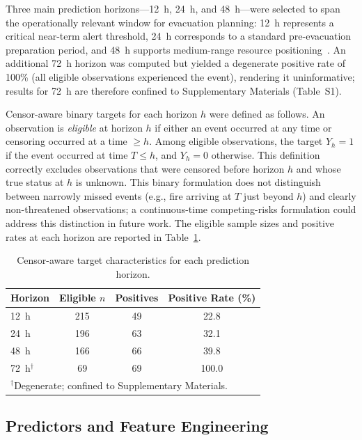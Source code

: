 \documentclass[fire,article,submit,pdftex]{../Definitions/mdpi}
\begin{document}
Three main prediction horizons---12~h, 24~h, and 48~h---were selected to span the operationally relevant window for evacuation planning: 12~h represents a critical near-term alert threshold, 24~h corresponds to a standard pre-evacuation preparation period, and 48~h supports medium-range resource positioning~\cite{Stephens2018,Taylor2013}.
An additional 72~h horizon was computed but yielded a degenerate positive rate of 100\% (all eligible observations experienced the event), rendering it uninformative; results for 72~h are therefore confined to Supplementary Materials (Table~S1).

Censor-aware binary targets for each horizon $h$ were defined as follows.
An observation is \emph{eligible} at horizon $h$ if either an event occurred at any time or censoring occurred at a time $\geq h$.
Among eligible observations, the target $Y_h = 1$ if the event occurred at time $T \leq h$, and $Y_h = 0$ otherwise.
This definition correctly excludes observations that were censored before horizon $h$ and whose true status at $h$ is unknown.
This binary formulation does not distinguish between narrowly missed events (e.g., fire arriving at $T$ just beyond $h$) and clearly non-threatened observations; a continuous-time competing-risks formulation could address this distinction in future work.
The eligible sample sizes and positive rates at each horizon are reported in Table~\ref{tab:horizons}.

\begin{table}[!ht]
\caption{Censor-aware target characteristics for each prediction horizon.}\label{tab:horizons}
\begin{tabular}{lccc}
\toprule
\textbf{Horizon} & \textbf{Eligible $n$} & \textbf{Positives} & \textbf{Positive Rate (\%)} \\
\midrule
12~h  & 215 & 49  & 22.8 \\
24~h  & 196 & 63  & 32.1 \\
48~h  & 166 & 66  & 39.8 \\
72~h$^\dagger$ & 69  & 69  & 100.0 \\
\bottomrule
\multicolumn{4}{l}{\footnotesize $^\dagger$Degenerate; confined to Supplementary Materials.}
\end{tabular}
\end{table}

\subsection{Predictors and Feature Engineering}\label{sec:features}
\end{document}

